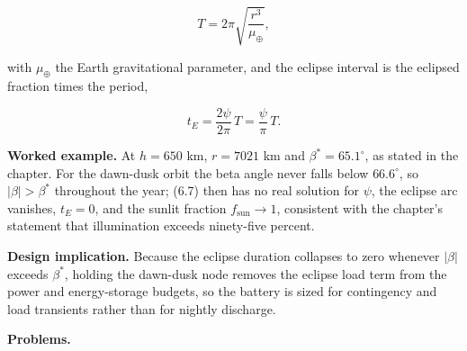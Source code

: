 \documentclass[
  11pt,
  openany,
  oneside]{book}
\begin{document}
\begin{equation}
T = 2\pi\sqrt{\frac{r^3}{\mu_\oplus}}, \tag{6.8}
\end{equation}

with \(\mu_\oplus\) the Earth gravitational parameter, and the eclipse
interval is the eclipsed fraction times the period,

\begin{equation}
t_E = \frac{2\psi}{2\pi}\,T = \frac{\psi}{\pi}\,T. \tag{6.9}
\end{equation}

\textbf{Worked example.} At \(h = 650\) km, \(r = 7021\) km and
\(\beta^\ast = 65.1^\circ\), as stated in the chapter. For the dawn-dusk
orbit the beta angle never falls below \(66.6^\circ\), so
\(|\beta| > \beta^\ast\) throughout the year; (6.7) then has no real
solution for \(\psi\), the eclipse arc vanishes, \(t_E = 0\), and the
sunlit fraction \(f_{\mathrm{sun}} \to 1\), consistent with the
chapter's statement that illumination exceeds ninety-five percent.

\textbf{Design implication.} Because the eclipse duration collapses to
zero whenever \(|\beta|\) exceeds \(\beta^\ast\), holding the dawn-dusk
node removes the eclipse load term from the power and energy-storage
budgets, so the battery is sized for contingency and load transients
rather than for nightly discharge.

\textbf{Problems.}
\end{document}
